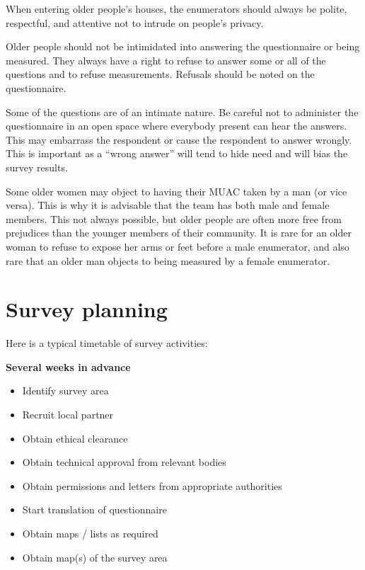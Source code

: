 \documentclass[12pt,a4paper]{book}
\providecommand{\tightlist}{%
  \setlength{\itemsep}{0pt}\setlength{\parskip}{0pt}}
\theoremstyle{definition}
\theoremstyle{definition}
\theoremstyle{definition}
\theoremstyle{remark}
\begin{document}
When entering older people's houses, the enumerators should always be
polite, respectful, and attentive not to intrude on people's privacy.

Older people should not be intimidated into answering the questionnaire
or being measured. They always have a right to refuse to answer some or
all of the questions and to refuse measurements. Refusals should be
noted on the questionnaire.

Some of the questions are of an intimate nature. Be careful not to
administer the questionnaire in an open space where everybody present
can hear the answers. This may embarrass the respondent or cause the
respondent to answer wrongly. This is important as a ``wrong answer''
will tend to hide need and will bias the survey results.

Some older women may object to having their MUAC taken by a man (or vice
versa). This is why it is advisable that the team has both male and
female members. This not always possible, but older people are often
more free from prejudices than the younger members of their community.
It is rare for an older woman to refuse to expose her arms or feet
before a male enumerator, and also rare that an older man objects to
being measured by a female enumerator.

\newpage

\hypertarget{survey-planning}{%
\section{Survey planning}\label{survey-planning}}

Here is a typical timetable of survey activities:

\textbf{Several weeks in advance}

\begin{itemize}
\tightlist
\item
  Identify survey area
\item
  Recruit local partner
\item
  Obtain ethical clearance
\item
  Obtain technical approval from relevant bodies
\item
  Obtain permissions and letters from appropriate authorities
\item
  Start translation of questionnaire
\item
  Obtain maps / lists as required
\item
  Obtain map(s) of the survey area
\end{itemize}
\end{document}
